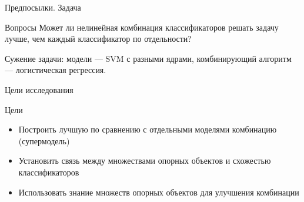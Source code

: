 \documentclass{beamer}
\begin{document}
\begin{frame}{Предпосылки. Задача}

     \begin{block}{Вопросы}
        Может ли нелинейная комбинация классификаторов решать задачу лучше, чем каждый классификатор по отдельности?
     \end{block}
     
     Сужение задачи: модели --- SVM с разными ядрами, комбинирующий алгоритм --- логистическая регрессия. 
\end{frame}
\begin{frame}{Цели исследования}
    \begin{block}{Цели}
        \begin{itemize}
        	\item Построить лучшую по сравнению с отдельными моделями комбинацию (супермодель)
        	\item Установить связь между множествами опорных объектов и схожестью классификаторов
        	\item Использовать знание множеств опорных объектов для улучшения комбинации
        \end{itemize}
    \end{block}
\end{frame}
\end{document}
